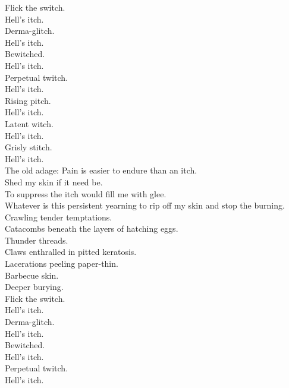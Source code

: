 Flick the switch. \\
Hell's itch. \\
Derma-glitch. \\
Hell's itch. \\
Bewitched. \\
Hell's itch. \\
Perpetual twitch. \\
Hell's itch. \\
Rising pitch. \\
Hell's itch. \\
Latent witch. \\
Hell's itch. \\
Grisly stitch. \\
Hell's itch. \\
The old adage: Pain is easier to endure than an itch. \\

Shed my skin if it need be. \\
To suppress the itch would fill me with glee. \\
Whatever is this persistent yearning to rip off my skin and stop the burning. \\
Crawling tender temptations. \\
Catacombs beneath the layers of hatching eggs. \\
Thunder threads. \\
Claws enthralled in pitted keratosis. \\
Lacerations peeling paper-thin. \\
Barbecue skin. \\
Deeper burying. \\

Flick the switch. \\
Hell's itch. \\
Derma-glitch. \\
Hell's itch. \\
Bewitched. \\
Hell's itch. \\
Perpetual twitch. \\
Hell's itch. \\

